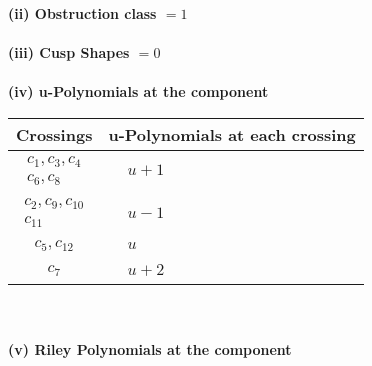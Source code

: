 \documentclass[1p]{elsarticle_modified}
\theoremstyle{definition}
\begin{document}
\flushleft \textbf{(ii) Obstruction class $= 1$}\\~\\
\flushleft \textbf{(iii) Cusp Shapes $= 0$}\\~\\
\newpage\renewcommand{\arraystretch}{1}
\flushleft \textbf{(iv) u-Polynomials at the component}\newline \\
\begin{tabular}{m{50pt}|m{274pt}}
Crossings & \hspace{64pt}u-Polynomials at each crossing \\
\hline $$\begin{aligned}c_{1},c_{3},c_{4}\\c_{6},c_{8}\end{aligned}$$&$\begin{aligned}
&u+1
\end{aligned}$\\
\hline $$\begin{aligned}c_{2},c_{9},c_{10}\\c_{11}\end{aligned}$$&$\begin{aligned}
&u-1
\end{aligned}$\\
\hline $$\begin{aligned}c_{5},c_{12}\end{aligned}$$&$\begin{aligned}
&u
\end{aligned}$\\
\hline $$\begin{aligned}c_{7}\end{aligned}$$&$\begin{aligned}
&u+2
\end{aligned}$\\
\hline
\end{tabular}\\~\\
\newpage\renewcommand{\arraystretch}{1}
\flushleft \textbf{(v) Riley Polynomials at the component}\newline \\
\end{document}
